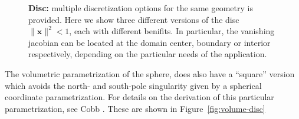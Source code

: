 \documentclass[preprint,12pt, a4paper]{elsarticle}
\begin{document}
\begin{figure}
  \begin{center}
    \hspace{.02\linewidth}
    \hspace{.02\linewidth}
    \caption{\textbf{Disc:} multiple discretization options for the same geometry is provided. Here we show three different versions of the disc $\|\mathbf{x}\|^2<1$, each with different benifits. In particular, the vanishing jacobian can be located at the domain center, boundary or interior respectively, depending on the particular needs of the application.}
    \label{fig:surface-disc}
  \end{center}
\end{figure}

The volumetric parametrization of the sphere, does also have a ``square'' version which avoids the north- and south-pole singularity given by a spherical coordinate parametrization.
For details on the derivation of this particular parametrization, see Cobb \cite{cobb1988tts}.
These are shown in Figure~\ref{fig:volume-disc}
\end{document}
